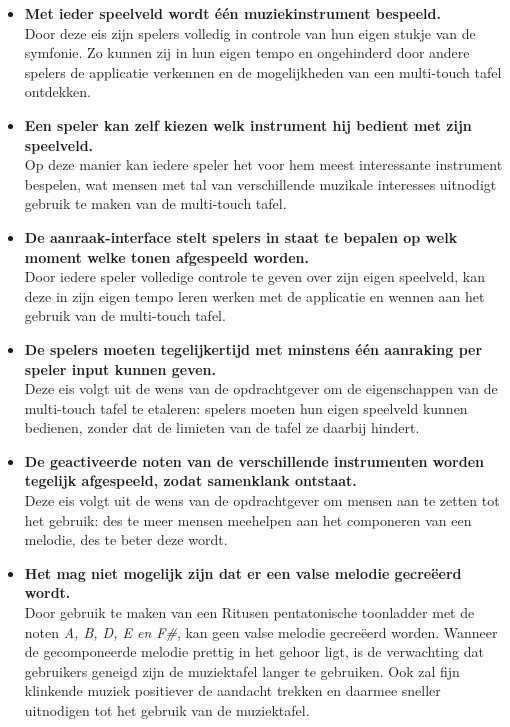 \documentclass{acm}
\begin{document}
\begin{itemize}
	\item \textbf{Met ieder speelveld wordt \'e\'en muziekinstrument bespeeld.} \\ Door deze eis zijn spelers volledig in controle van hun eigen stukje van de symfonie. Zo kunnen zij in hun eigen tempo en ongehinderd door andere spelers de applicatie verkennen en de mogelijkheden van een multi-touch tafel ontdekken.
	
	\item \textbf{Een speler kan zelf kiezen welk instrument hij bedient met zijn speelveld.} \\ Op deze manier kan iedere speler het voor hem meest interessante instrument bespelen, wat mensen met tal van verschillende muzikale interesses uitnodigt gebruik te maken van de multi-touch tafel.
	
	\item \textbf{De aanraak-interface stelt spelers in staat te bepalen op welk moment welke tonen afgespeeld worden.} \\ Door iedere speler volledige controle te geven over zijn eigen speelveld, kan deze in zijn eigen tempo leren werken met de applicatie en wennen aan het gebruik van de multi-touch tafel.
	
	\item \textbf{De spelers moeten tegelijkertijd met minstens \'e\'en aanraking per speler input kunnen geven.} \\ Deze eis volgt uit de wens van de opdrachtgever om de eigenschappen van de multi-touch tafel te etaleren: spelers moeten hun eigen speelveld kunnen bedienen, zonder dat de limieten van de tafel ze daarbij hindert.\cite{Gross}
	
	\item \textbf{De geactiveerde noten van de verschillende instrumenten worden tegelijk afgespeeld, zodat samenklank ontstaat.} \\ Deze eis volgt uit de wens van de opdrachtgever om mensen aan te zetten tot het gebruik: des te meer mensen meehelpen aan het componeren van een melodie, des te beter deze wordt.
	
	\item \textbf{Het mag niet mogelijk zijn dat er een valse melodie gecre\"eerd wordt.} \\ Door gebruik te maken van een Ritusen pentatonische toonladder met de noten \textit{A, B, D, E en F\#}, kan geen valse melodie gecre\"eerd worden.\cite{Chua} Wanneer de gecomponeerde melodie prettig in het gehoor ligt, is de verwachting dat gebruikers geneigd zijn de muziektafel langer te gebruiken. Ook zal fijn klinkende muziek positiever de aandacht trekken en daarmee sneller uitnodigen tot het gebruik van de muziektafel.
	

\end{itemize}
\end{document}
